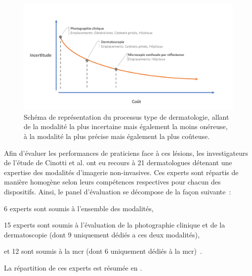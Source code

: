\begin{figure}[H]
    \centering
    \includegraphics[width=\linewidth]{contents/chapter_4/resources/scheme_devices_location.pdf}
    \caption{Schéma de représentation du processus type de dermatologie, allant de la modalité la plus incertaine mais également la moins onéreuse, à la modalité la plus précise mais également la plus coûteuse.}
    \label{fig:scheme_devices_location}
\end{figure}\par

\addtocounter{footnote}{1}
\addtocounter{footnote}{1}
\addtocounter{footnote}{1}

Afin d'évaluer les performances de praticiens face à ces lésions, les investigateurs de l'étude de Cinotti et al. ont eu recours à 21 dermatologues détenant une expertise des modalités d'imagerie non-invasives. Ces experts sont répartis de manière homogène selon leurs compétences respectives pour chacun des dispositifs. Ainsi, le panel d'évaluation se décompose de la façon suivante~:
\begin{inlinerate}
    \item 6 experts sont soumis à l'ensemble des modalités,
    \item 15 experts sont soumis à l'évaluation de la photographie clinique et de la dermatoscopie (dont 9 uniquement dédiés a ces deux modalités),
    \item et 12 sont soumis à la \gls{mcr} (dont 6 uniquement dédiés à la \gls{mcr})~\cite{Cinotti2018}.
\end{inlinerate}
La répartition de ces experts est résumée en .\par

